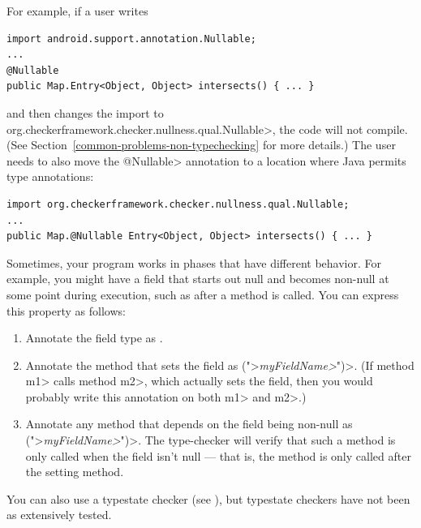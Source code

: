 For example, if a user writes

\begin{Verbatim}
import android.support.annotation.Nullable;
...
@Nullable
public Map.Entry<Object, Object> intersects() { ... }
\end{Verbatim}

\noindent
and then changes the import to
\<org.checkerframework.checker.nullness.qual.Nullable>, the code will not
compile.  (See Section~\ref{common-problems-non-typechecking} for more details.)
The user needs to also move the \<@Nullable> annotation to a location where
Java permits type annotations:

\begin{Verbatim}
import org.checkerframework.checker.nullness.qual.Nullable;
...
public Map.@Nullable Entry<Object, Object> intersects() { ... }
\end{Verbatim}





Sometimes, your program works in phases that have different behavior.  For
example, you might have a field that starts out null and becomes non-null
at some point during execution, such as after a method is called.  You can
express this property as follows:

\begin{enumerate}
\item
Annotate the field type as .
\item
Annotate the method that sets the field as \<(">\emph{\<myFieldName>}\<")>.
(If method \<m1> calls method \<m2>, which actually sets the field, then
you would probably write this annotation on both \<m1> and \<m2>.)
\item
Annotate any method that depends on the field being non-null as
\<(">\emph{\<myFieldName>}\<")>.
The type-checker will verify that such a method is only called when the
field isn't null --- that is, the method is only called after the setting
method.
\end{enumerate}

You can also use a typestate checker (see
), but typestate checkers have not been as
extensively tested.


